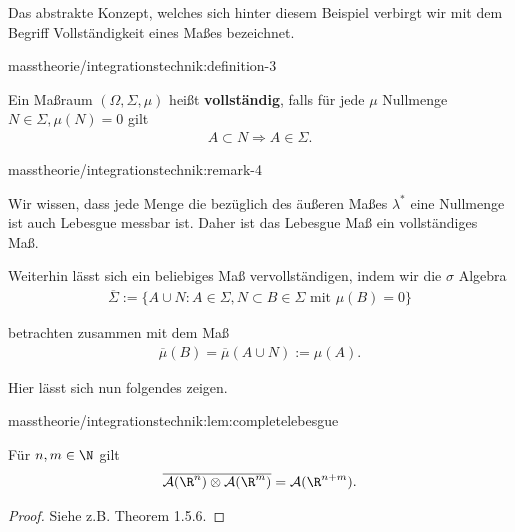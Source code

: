 \documentclass[letterpaper,10pt,german]{jupyterBook}
\begin{document}
\par
Das abstrakte Konzept, welches sich hinter diesem Beispiel verbirgt wir mit dem Begriff Vollständigkeit eines Maßes bezeichnet.
\begin{definition}{}{masstheorie/integrationstechnik:definition-3}



\par
Ein Maßraum \((\Omega,\Sigma,\mu)\) heißt \textbf{vollständig}, falls für jede \(\mu\) Nullmenge \(N\in\Sigma, \mu(N)=0\) gilt
\begin{align*}
A\subset N \Rightarrow A\in \Sigma.
\end{align*}\end{definition}
\begin{remark}{}{masstheorie/integrationstechnik:remark-4}



\par
Wir wissen, dass jede Menge die bezüglich des äußeren Maßes \(\lambda^\ast\) eine Nullmenge ist auch Lebesgue messbar ist. Daher ist das Lebesgue Maß ein vollständiges Maß.
\end{remark}

\par
Weiterhin lässt sich ein beliebiges Maß vervollständigen, indem wir die \(\sigma\) Algebra
\begin{align*}
\overline{\Sigma}:=\{A\cup N: A\in\Sigma, N\subset B\in\Sigma\text{ mit }\mu(B)=0\}
\end{align*}
\par
betrachten zusammen mit dem Maß
\begin{align*}
\overline{\mu}(B)= \overline{\mu}(A\cup N):= \mu(A).
\end{align*}
\par
Hier lässt sich nun folgendes zeigen.
\begin{lemma}{}{masstheorie/integrationstechnik:lem:completelebesgue}



\par
Für \(n,m\in\N\) gilt
\begin{align*}
\overline{\mathcal{A}(\R^n)\otimes\mathcal{A}(\R^m)}= \mathcal{A}(\R^{n+m}).
\end{align*}\end{lemma}

\begin{proof}
 Siehe z.B. \cite{Bog07} Theorem 1.5.6.
\end{proof}
\end{document}

